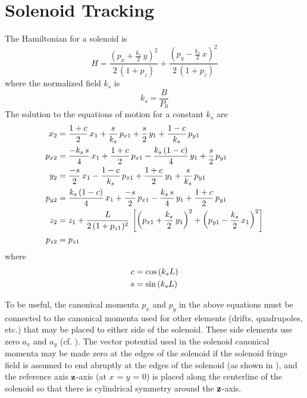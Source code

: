\section{Solenoid Tracking}
\label{s:solenoid.std}

The Hamiltonian for a solenoid is
\begin{equation}
  H = \frac{ \left( p_x + \frac{k_s}{2} \, y \right)^2}{2 \, (1 + p_z)} + 
  \frac{ \left( p_y - \frac{k_s}{2} \, x \right)^2}{2 \, (1 + p_z)} 
\end{equation}
where the normalized field $k_s$ is
\begin{equation}
  k_s = \frac{B}{P_0}
\end{equation}
The solution to the equations of motion for a constant $k_s$ are
\begin{align}
  x_2    &= \frac{1 + c}{2} \, x_1 + \frac{s}{k_s} \, p_{x1} +
           \frac{s}{2} \, y_1 + \frac{1 - c}{k_s} \, p_{y1} \nonumber \\
  p_{x2} &= \frac{-k_s \, s}{4} \, x_1 + \frac{1 + c}{2} \, p_{x1} - 
           \frac{k_s \, (1 - c)}{4} \, y_1 + \frac{s}{2} \, p_{y1} \nonumber \\
  y_2    &= \frac{-s}{2} \, x_1 - \frac{1 - c}{k_s} \, p_{x1} +
           \frac{1 + c}{2} \, y_1 + \frac{s}{k_s} \, p_{y1} \\      
  p_{y2} &= \frac{k_s \, (1 - c)}{4} \, x_1 + \frac{-s}{2} \, p_{x1} -
            \frac{k_s \, s}{4} \, y_1 + \frac{1 + c}{2} \, p_{y1} \nonumber \\ 
  z_2    &= z_1 + \frac{L}{2 \, (1 + p_{z1})^2} \, 
                   \left[ \left( p_{x1} + \frac{k_s}{2} \, y_1 \right)^2 +
                          \left( p_{y1} - \frac{k_s}{2} \, x_1 \right)^2 \right] \nonumber \\
  p_{z2} &= p_{z1} \nonumber
\end{align}
where
\begin{align}
  c &= \cos \left( k_s L \right) \nonumber \\
  s &= \sin \left( k_s L \right)
\end{align}

To be useful, the canonical momenta $p_x$ and $p_y$ in the above
equations must be connected to the canonical momenta used for other
elements (drifts, quadrupoles, etc.) that may be placed to either side
of the solenoid. These side elements use zero $a_x$ and $a_y$
(cf. ). The vector potential used in the solenoid canonical
momenta may be made zero at the edges of the solenoid if the solenoid
fringe field is assumed to end abruptly at the edges of the solenoid
(as shown in ), and the reference axis ${\bf z}$-axis (at
$x$ = $y$ = 0) is placed along the centerline of the solenoid so that
there is cylindrical symmetry around the ${\bf z}$-axis.

